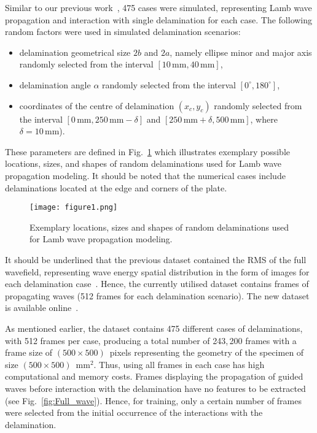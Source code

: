 Similar to our previous work~\cite{Ijjeh2021}, 475 cases were simulated, representing Lamb wave propagation and interaction with single delamination for each case. 
The following random factors were used in simulated delamination scenarios:
\begin{itemize}
	\item delamination geometrical size	\(2b\) and \(2a\), namely ellipse minor and major axis randomly selected from the interval \(\left[10 \, \textrm{mm}, 40\, \textrm{mm}\right]\),
	\item delamination angle \(\alpha\) randomly selected from the interval \( \left[ 0^{\circ}, 180^{\circ} \right]\),
	\item coordinates of the centre of delamination \((x_c,y_c)\) randomly selected from the interval \(\left[0\, \textrm{mm}, 250\, \textrm{mm} -\delta \right]\) and \( \left[250\, \textrm{mm}+\delta, 500\, \textrm{mm} \right] \), where \(\delta = 10\, \textrm{mm}\)).
\end{itemize}
These parameters are defined in Fig.~\ref{fig:random_delaminations} which illustrates exemplary possible locations, sizes, and shapes of random delaminations used for Lamb wave propagation modeling.
It should be noted that the numerical cases include delaminations located at the edge and corners of the plate.
\begin{figure}[!h]
	\centering
	\texttt{[image: figure1.png]}
	\caption{Exemplary locations, sizes and shapes of random delaminations used for Lamb wave propagation modeling.}
	\label{fig:random_delaminations}
\end{figure}

It should be underlined that the previous dataset contained the RMS of the full wavefield, representing wave energy spatial distribution in the form of images for each delamination case~\cite{Kudela2020d}.
Hence, the currently utilised dataset contains frames of propagating waves (512 frames for each delamination scenario).
The new dataset is available online~\cite{kudela_pawel_2021_5414555}.

As mentioned earlier, the dataset contains 475 different cases of delaminations, with 512 frames per case, producing a total number of 243,\,200 frames with a frame size of \((500\times500)\)~pixels representing the geometry of the specimen of size \((500\times500)\)~mm\(^{2}\).
Thus, using all frames in each case has high computational and memory costs.
Frames displaying the propagation of guided waves before interaction with the delamination have no features to be extracted (see Fig.~\ref{fig:Full_wave}).
Hence, for training, only a certain number of frames were selected from the initial occurrence of the interactions with the delamination.

